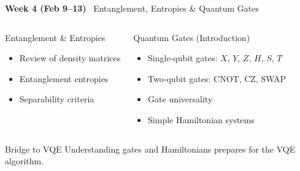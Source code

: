 \documentclass[aspectratio=169,12pt]{beamer}
\newcommand{\week}[1]{\textcolor{qgold}{\textbf{#1}}}
\begin{document}
\begin{frame}{\week{Week 4 (Feb 9--13)} \ Entanglement, Entropies \& Quantum Gates}
  \begin{columns}[T]
      \begin{block}{Entanglement \& Entropies}
        \begin{itemize}
          \item Review of density matrices
          \item Entanglement entropies
          \item Separability criteria
        \end{itemize}
      \end{block}
      \begin{block}{Quantum Gates (Introduction)}
        \begin{itemize}
          \item Single-qubit gates: $X$, $Y$, $Z$, $H$, $S$, $T$
          \item Two-qubit gates: CNOT, CZ, SWAP
          \item Gate universality
          \item Simple Hamiltonian systems
        \end{itemize}
      \end{block}
  \end{columns}
  \vspace{6pt}
  \begin{alertblock}{Bridge to VQE}
    Understanding gates and Hamiltonians prepares for the VQE algorithm.
  \end{alertblock}
\end{frame}
\end{document}
